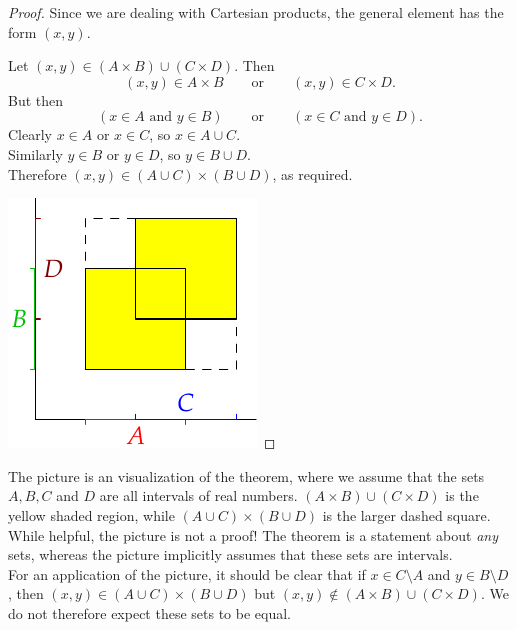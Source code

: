 \begin{proof}
Since we are dealing with Cartesian products, the general element has the form $(x,y)$.\\
\noindent\begin{minipage}{0.65\textwidth}
Let $(x,y)\in(A\times B)\cup(C\times D)$. Then 
\[(x,y)\in A\times B\qquad \text{or}\qquad (x,y)\in C\times D.\]
But then
\[(x\in A\text{ and }y\in B)\qquad\text{or}\qquad(x\in C\text{ and }y\in D).\]
Clearly $x\in A$ or $x\in C$, so $x\in A\cup C$.\\
Similarly $y\in B$ or $y\in D$, so $y\in B\cup D$.\\
Therefore $(x,y)\in (A\cup C)\times(B\cup D)$, as required.
\end{minipage}
\qquad
\begin{minipage}{0.28\textwidth}
\centering
\includegraphics[width=\textwidth]{setsii-04-cartesian}
\end{minipage}
\end{proof}

\noindent The picture is an visualization of the theorem, where we assume that the sets $A,B,C$ and $D$ are all intervals of real numbers. $(A\times B)\cup(C\times D)$ is the yellow shaded region, while $(A\cup C)\times(B\cup D)$ is the larger dashed square. While helpful, the picture is not a proof! The theorem is a statement about \emph{any} sets, whereas the picture implicitly assumes that these sets are intervals.\\
For an application of the picture, it should be clear that if $x\in C\setminus A$ and $y\in B\setminus D$, then $(x,y)\in (A\cup C)\times (B\cup D)$ but $(x,y)\not\in (A\times B)\cup(C\times D)$. We do not therefore expect these sets to be equal.

